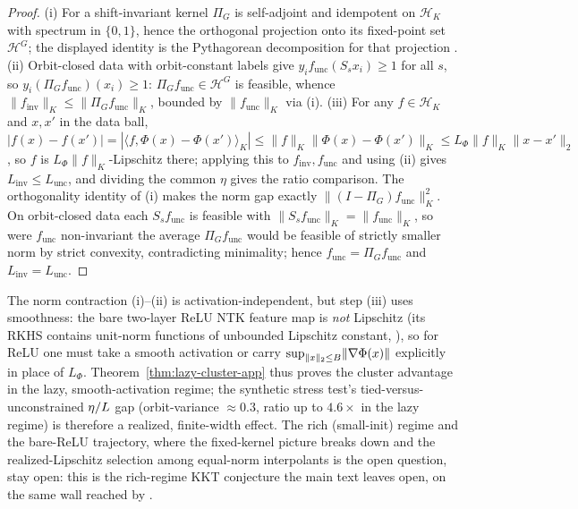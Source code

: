 \begin{proof}
(i) For a shift-invariant kernel $\Pi_G$ is self-adjoint and idempotent on
$\mathcal H_K$ with spectrum in $\{0,1\}$, hence the orthogonal projection onto
its fixed-point set $\mathcal H^G$; the displayed identity is the Pythagorean
decomposition for that projection \citep{elesedy2021provably}. (ii) Orbit-closed
data with orbit-constant labels give $y_if_{\mathrm{unc}}(S_sx_i)\ge1$ for all
$s$, so $y_i(\Pi_Gf_{\mathrm{unc}})(x_i)\ge1$: $\Pi_Gf_{\mathrm{unc}}\in\mathcal H^G$
is feasible, whence
$\lVert f_{\mathrm{inv}}\rVert_K\le\lVert\Pi_Gf_{\mathrm{unc}}\rVert_K$, bounded by
$\lVert f_{\mathrm{unc}}\rVert_K$ via (i). (iii) For any $f\in\mathcal H_K$ and
$x,x'$ in the data ball,
$|f(x)-f(x')|=|\langle f,\Phi(x)-\Phi(x')\rangle_K|\le\lVert f\rVert_K\lVert\Phi(x)-\Phi(x')\rVert_K\le L_\Phi\lVert f\rVert_K\lVert x-x'\rVert_2$,
so $f$ is $L_\Phi\lVert f\rVert_K$-Lipschitz there; applying this to
$f_{\mathrm{inv}},f_{\mathrm{unc}}$ and using (ii) gives
$L_{\mathrm{inv}}\le L_{\mathrm{unc}}$, and dividing the common $\eta$ gives the
ratio comparison. The orthogonality identity of (i) makes the norm gap exactly
$\lVert(I-\Pi_G)f_{\mathrm{unc}}\rVert_K^2$. On orbit-closed data each
$S_sf_{\mathrm{unc}}$ is feasible with $\lVert S_sf_{\mathrm{unc}}\rVert_K=\lVert f_{\mathrm{unc}}\rVert_K$,
so were $f_{\mathrm{unc}}$ non-invariant the average
$\Pi_Gf_{\mathrm{unc}}$ would be feasible of strictly smaller norm by strict
convexity, contradicting minimality; hence $f_{\mathrm{unc}}=\Pi_Gf_{\mathrm{unc}}$
and $L_{\mathrm{inv}}=L_{\mathrm{unc}}$.
\end{proof}

\begin{remark}\label{rem:lazy-relu-app}
The norm contraction (i)--(ii) is activation-independent, but step (iii) uses
smoothness: the bare two-layer ReLU NTK feature map is \emph{not} Lipschitz (its
RKHS contains unit-norm functions of unbounded Lipschitz constant,
\citealp{bietti2019inductive}), so for ReLU one must take a smooth activation or
carry $\sup_{\lVert x\rVert_2\le B}\lVert\nabla\Phi(x)\rVert$ explicitly in place
of $L_\Phi$. Theorem~\ref{thm:lazy-cluster-app} thus proves the cluster
advantage in the lazy, smooth-activation regime; the synthetic stress test's
tied-versus-unconstrained $\eta/L$ gap (orbit-variance $\approx0.3$, ratio up to
$4.6\times$ in the lazy regime) is therefore a realized, finite-width effect. The
rich (small-init) regime and the bare-ReLU trajectory, where the fixed-kernel
picture breaks down \citep{chizat2019lazy} and the realized-Lipschitz selection
among equal-norm interpolants is the open question, stay open: this is the
rich-regime KKT conjecture the main text leaves open, on the same wall reached by
\citet{frei2023double,min2024can,li2025feature}.
\end{remark}

